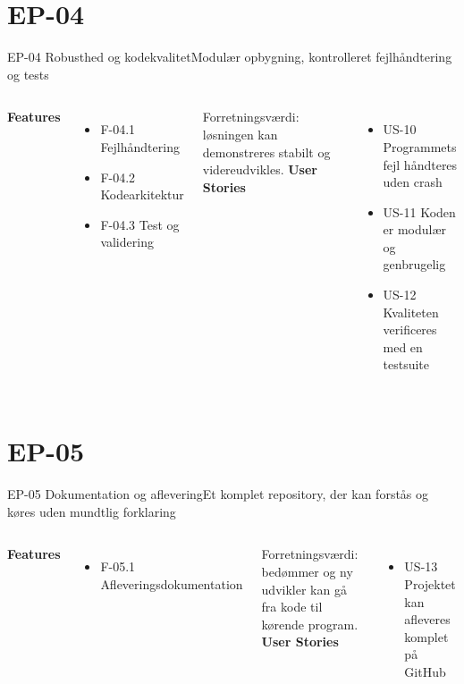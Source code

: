 \documentclass[aspectratio=169,10pt]{beamer}
\newcommand{\done}{\textcolor{accent}{\faCheckCircle}}
\newcommand{\open}{\textcolor{muted}{\faCircle}}
\begin{document}
\section{EP-04}
\begin{frame}{EP-04 Robusthed og kodekvalitet}{Modulær opbygning, kontrolleret fejlhåndtering og tests}
  \begin{columns}[T]
    \textbf{Features}
    \vspace{0.3em}
    \begin{itemize}
      \item F-04.1 Fejlhåndtering
      \item F-04.2 Kodearkitektur
      \item[\open] F-04.3 Test og validering
    \end{itemize}
    \vspace{0.2em}
    {\footnotesize\color{muted}Forretningsværdi: løsningen kan demonstreres stabilt og videreudvikles.}
    \textbf{User Stories}
    \vspace{0.3em}
    \begin{itemize}
      \item[\done] US-10 Programmets fejl håndteres uden crash
      \item[\done] US-11 Koden er modulær og genbrugelig
      \item[\done] US-12 Kvaliteten verificeres med en testsuite
    \end{itemize}
  \end{columns}
\end{frame}

\section{EP-05}
\begin{frame}{EP-05 Dokumentation og aflevering}{Et komplet repository, der kan forstås og køres uden mundtlig forklaring}
  \begin{columns}[T]
    \textbf{Features}
    \vspace{0.3em}
    \begin{itemize}
      \item F-05.1 Afleveringsdokumentation
    \end{itemize}
    \vspace{0.4em}
    {\footnotesize\color{muted}Forretningsværdi: bedømmer og ny udvikler kan gå fra kode til kørende program.}
    \textbf{User Stories}
    \vspace{0.3em}
    \begin{itemize}
      \item[\done] US-13 Projektet kan afleveres komplet på GitHub
    \end{itemize}
  \end{columns}
\end{frame}
\end{document}
